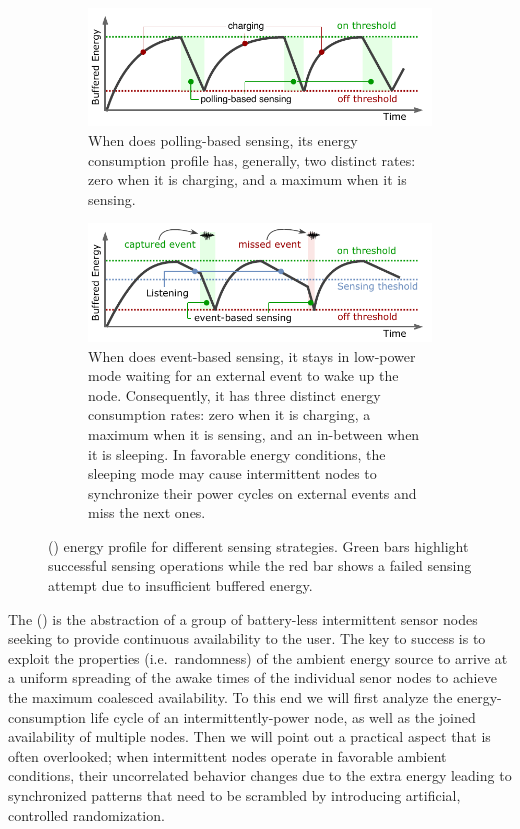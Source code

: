 \begin{figure}[t]
	\centering
		\begin{subfigure}{\columnwidth}
			\includegraphics[width=\columnwidth]{figures/PowerCycleIntermittentSystem}
			\caption{When \sys does polling-based sensing, its energy consumption profile has, generally, two distinct rates: zero when it is charging, and a maximum when it is sensing.}
			\label{fig:pollingBasedSensing}
	\end{subfigure}
	\begin{subfigure}{\columnwidth}
		\includegraphics[width=\columnwidth]{figures/PowerCycleIntermittentSensor}
		\caption{When \sys does event-based sensing, it stays in low-power mode waiting for an external event to wake up the node. Consequently,  it has three distinct energy consumption rates: zero when it is charging, a maximum when it is sensing, and an in-between when it is sleeping. In favorable energy conditions, the sleeping mode may cause intermittent nodes to synchronize their power cycles on external events and miss the next ones.}
		\label{fig:eventBasedSensing}
\end{subfigure}
		\caption{\fullsys (\sys) energy profile for different sensing strategies. Green bars highlight successful sensing operations  while the red bar shows a failed sensing attempt due to insufficient buffered energy.}
		\label{fig:cisPwrCycle}
\end{figure} 
%
The \fullsys (\sys) is the abstraction of a group of battery-less intermittent sensor nodes seeking to provide continuous availability to the user. The key to success is to exploit the properties (i.e.\ randomness) of the ambient energy source to arrive at a uniform spreading of the awake times of the individual senor nodes to achieve the maximum coalesced availability. To this end we will first analyze the energy-consumption life cycle of an intermittently-power node, as well as the joined availability of multiple nodes. Then we will point out a practical aspect that is often overlooked; when intermittent nodes operate in favorable ambient conditions, their uncorrelated behavior changes due to the extra energy leading to synchronized patterns that need to be scrambled by introducing artificial, controlled randomization.


